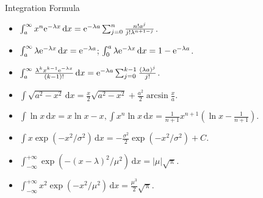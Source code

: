 \documentclass[landscape,a4paper]{article}
\begin{document}
\begin{cheatsheetcolumns}
\begin{card}{Integration Formula}
\begin{itemize}
				\item $\int_a^\infty x^n\mathrm{e}^{-\lambda x}\,\mathrm dx=\mathrm{e}^{-\lambda a}\sum_{j=0}^n\frac{n!a^j}{j!\lambda^{n+1-j}}$.
				\item $\int_a^\infty\lambda\mathrm{e}^{-\lambda x}\,\mathrm dx=\mathrm{e}^{-\lambda a}$; $\int_0^a\lambda\mathrm{e}^{-\lambda x}\,\mathrm dx=1-\mathrm{e}^{-\lambda a}$.
				\item $\int_a^\infty\frac{\lambda^kx^{k-1}\mathrm{e}^{-\lambda x}}{(k-1)!}\,\mathrm dx=\mathrm{e}^{-\lambda a}\sum_{j=0}^{k-1}\frac{(\lambda a)^j}{j!}$.
				\item $\int\sqrt{a^2-x^2}\,\mathrm dx=\frac{x}{2}\sqrt{a^2-x^2}+\frac{a^2}{2}\arcsin\frac{x}{a}.$
				\item $\int \ln x\,\mathrm dx=x\ln x-x,\int x^n\ln x\,\mathrm dx=\frac{1}{n+1}x^{n+1}\left(\ln x-\frac{1}{n+1}\right).$
				\item $\int x\exp\left(-x^2/\sigma^2\right)\,\mathrm dx=-\frac{\sigma^2}{2}\exp\left(-x^2/\sigma^2\right)+C.$
				\item $\int_{-\infty}^{+\infty} \exp\left(-(x-\lambda)^2/\mu^2\right)\,\mathrm dx=|\mu|\sqrt{\uppi}$.
				\item $\int_{-\infty}^{+\infty}x^2\exp\left(-x^2/\mu^2\right)\,\mathrm dx=\frac{\mu^3}{2}\sqrt{\uppi}.$
			\end{itemize}
		\end{card}
	\end{cheatsheetcolumns}
\end{document}
